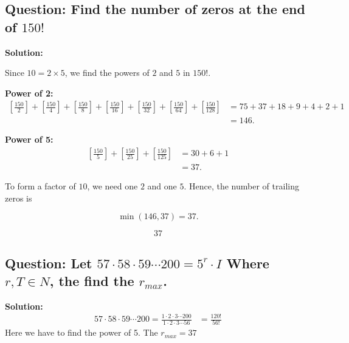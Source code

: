 \subsection*{Question: Find the number of zeros at the end of $150!$}

\textbf{Solution:}

Since $10 = 2 \times 5$, we find the powers of $2$ and $5$ in $150!$.

\medskip
\textbf{Power of 2:}
\[
\begin{aligned}
\left[\frac{150}{2}\right]
+ \left[\frac{150}{4}\right]
+ \left[\frac{150}{8}\right]
+ \left[\frac{150}{16}\right]
+ \left[\frac{150}{32}\right]
+ \left[\frac{150}{64}\right]
+ \left[\frac{150}{128}\right]
&= 75 + 37 + 18 + 9 + 4 + 2 + 1 \\
&= 146.
\end{aligned}
\]

\textbf{Power of 5:}
\[
\begin{aligned}
\left[\frac{150}{5}\right]
+ \left[\frac{150}{25}\right]
+ \left[\frac{150}{125}\right]
&= 30 + 6 + 1 \\
&= 37.
\end{aligned}
\]

To form a factor of $10$, we need one $2$ and one $5$.  
Hence, the number of trailing zeros is

\[
\min(146, 37) = 37.
\]

\[
\boxed{37}
\]

\subsection*{Question: Let $57\cdot58\cdot59\cdots200=5^r\cdot I$ Where $r,T \in N$, the find the $r_{max}$.}
\textbf{Solution: } \\
\[
\begin{aligned}
57\cdot58\cdot59\cdots200 = \frac{1\cdot2\cdot3\cdots200}{1\cdot2\cdot3\cdots56}
&=\frac{120!}{56!}
\end{aligned}
\]
Here we have to find the power of 5. The $r_{max}=37$